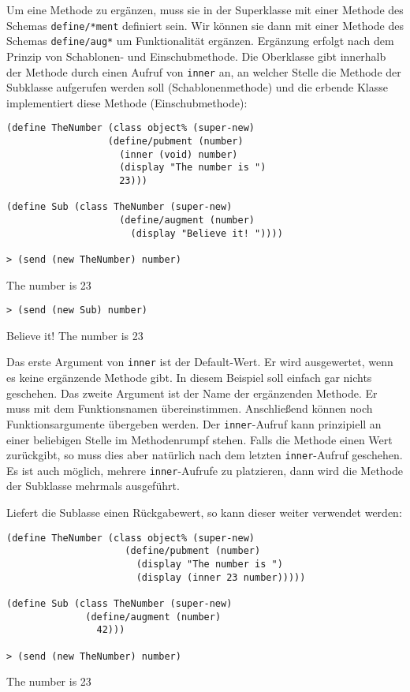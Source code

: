 Um eine Methode zu ergänzen, muss sie in der Superklasse mit einer Methode des Schemas \texttt{define/*ment} definiert sein. Wir können sie dann mit einer Methode des Schemas \texttt{define/aug*} um Funktionalität ergänzen. Ergänzung erfolgt nach dem Prinzip von Schablonen- und Einschubmethode. Die Oberklasse gibt innerhalb der Methode durch einen Aufruf von \texttt{inner} an, an welcher Stelle die Methode der Subklasse aufgerufen werden soll (Schablonenmethode) und die erbende Klasse implementiert diese Methode (Einschubmethode):

\begin{lstlisting}
(define TheNumber (class object% (super-new)
                  (define/pubment (number)
                    (inner (void) number)
                    (display "The number is ")
                    23)))

(define Sub (class TheNumber (super-new)
                    (define/augment (number)
                      (display "Believe it! "))))
                      
> (send (new TheNumber) number)
\end{lstlisting}
{\routput The number is 23}

\begin{lstlisting}                
> (send (new Sub) number)
\end{lstlisting}
{\routput Believe it! The number is 23}

Das erste Argument von \texttt{inner} ist der Default-Wert. Er wird ausgewertet, wenn es keine ergänzende Methode gibt. In diesem Beispiel soll einfach gar nichts geschehen. Das zweite Argument ist der Name der ergänzenden Methode. Er muss mit dem Funktionsnamen übereinstimmen. Anschließend können noch Funktionsargumente übergeben werden. Der \texttt{inner}-Aufruf kann prinzipiell an einer beliebigen Stelle im Methodenrumpf stehen. Falls die Methode einen Wert zurückgibt, so muss dies aber natürlich nach dem letzten \texttt{inner}-Aufruf geschehen. Es ist auch möglich, mehrere \texttt{inner}-Aufrufe zu platzieren, dann wird die Methode der Subklasse mehrmals ausgeführt. 

Liefert die Sublasse einen Rückgabewert, so kann dieser weiter verwendet werden:

\begin{lstlisting}
(define TheNumber (class object% (super-new)
                     (define/pubment (number)
                       (display "The number is ")
                       (display (inner 23 number)))))

(define Sub (class TheNumber (super-new)
              (define/augment (number)
                42)))

> (send (new TheNumber) number)
\end{lstlisting}
{\routput The number is 23}


